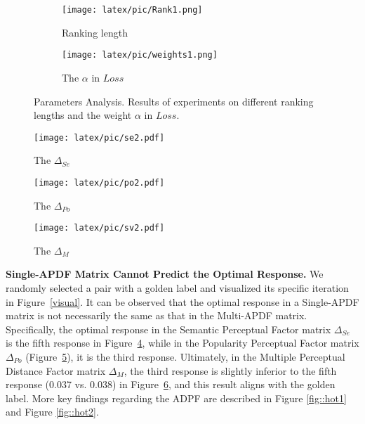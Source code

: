 \begin{figure}
  \centering
  \begin{subfigure}{0.475\linewidth}
    \texttt{[image: latex/pic/Rank1.png]}
    \caption{Ranking length}
    \label{para:rank}
  \end{subfigure}
  \begin{subfigure}{0.475\linewidth}
    \texttt{[image: latex/pic/weights1.png]}
    \caption{The \(\alpha\) in \(Loss\)}
    \label{para:weight}
  \end{subfigure}
  \caption{Parameters Analysis. Results of experiments on different ranking lengths and the weight \(\alpha\) in \(Loss\).}
  \label{fig:para}
\end{figure}
\begin{figure*}
  \centering
  \begin{subfigure}{0.305\linewidth}
    \texttt{[image: latex/pic/se2.pdf]}
    \caption{The \(\Delta_{Se}\)}
    \label{visual:se}
  \end{subfigure}
  \begin{subfigure}{0.305\linewidth}
    \texttt{[image: latex/pic/po2.pdf]}
    \caption{The \(\Delta_{Po}\)}
    \label{visual:po}
  \end{subfigure}
  \begin{subfigure}{0.305\linewidth}
    \texttt{[image: latex/pic/sv2.pdf]}
    \caption{The \(\Delta_{M}\)}
    \label{visual:sv}
  \end{subfigure}
  \caption{The Visualization of Attribute-Perceptual Distance Factors (APDF) matrix of five responses. The blue represents the response with the highest APDF, and SeAdpra aligns with the fifth response corresponding to the maximum Multi-APDF in (c). The green represents the second response that is next best to the red one.}
  \label{visual}
\end{figure*}
\textbf{Single-APDF Matrix Cannot Predict the Optimal Response.} We randomly selected a pair with a golden label and visualized its specific iteration in Figure~\ref{visual}.
It can be observed that the optimal response in a Single-APDF matrix is not necessarily the same as that in the Multi-APDF matrix.
Specifically, the optimal response in the Semantic Perceptual Factor matrix \(\Delta_{Se}\) is the fifth response in Figure~\ref{visual:se}, while in the Popularity Perceptual Factor matrix \(\Delta_{Po}\) (Figure~\ref{visual:po}), it is the third response. Ultimately, in the Multiple Perceptual Distance Factor matrix \(\Delta_{M}\), the third response is slightly inferior to the fifth response (0.037 vs. 0.038) in Figure~\ref{visual:sv}, and this result aligns with the golden label.
More key findings regarding the ADPF are described in Figure \ref{fig::hot1} and Figure \ref{fig::hot2}.
